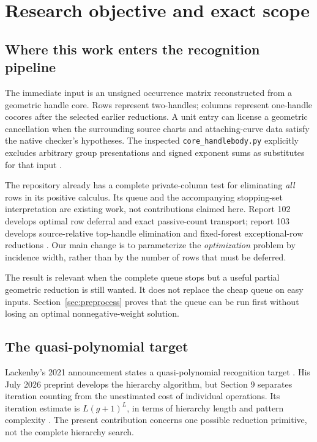 \documentclass[11pt,a4paper]{article}
\theoremstyle{definition}
\theoremstyle{remark}
\newcommand{\code}[1]{\nolinkurl{#1}}
\begin{document}
\section{Research objective and exact scope}
\label{sec:scope}

\subsection{Where this work enters the recognition pipeline}
The immediate input is an unsigned occurrence matrix reconstructed from a
geometric handle core. Rows represent two-handles; columns represent
one-handle cocores after the selected earlier reductions. A unit entry can
license a geometric cancellation when the surrounding source charts and
attaching-curve data satisfy the native checker's hypotheses. The inspected
\code{core_handlebody.py} explicitly excludes arbitrary group
presentations and signed exponent sums as substitutes for that input
\cite{repo-core}.

The repository already has a complete private-column test for eliminating
\emph{all} rows in its positive calculus. Its queue and the accompanying
stopping-set interpretation are existing work, not contributions claimed
here. Report 102 develops optimal row deferral and exact passive-count
transport; report 103 develops source-relative top-handle elimination and
fixed-forest exceptional-row reductions \cite{repo102,repo103}. Our main
change is to parameterize the \emph{optimization} problem by incidence
width, rather than by the number of rows that must be deferred.

The result is relevant when the complete queue stops but a useful partial
geometric reduction is still wanted. It does not replace the cheap queue
on easy inputs. Section~\ref{sec:preprocess} proves that the queue can be
run first without losing an optimal nonnegative-weight solution.

\subsection{The quasi-polynomial target}
Lackenby's 2021 announcement states a quasi-polynomial recognition target
\cite{lackenby-talk}. His July 2026 preprint develops the hierarchy
algorithm, but Section 9 separates iteration counting from the unestimated
cost of individual operations. Its iteration estimate is $L(g+1)^L$, in
terms of hierarchy length and pattern complexity \cite{lackenby2026}.
The present contribution concerns one possible reduction primitive, not the
complete hierarchy search.
\end{document}
